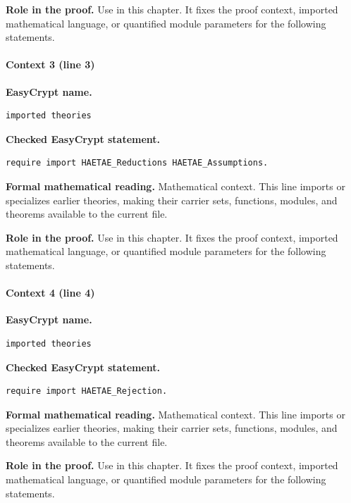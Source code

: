 \noindent\textbf{Role in the proof.}
Use in this chapter. It fixes the proof context, imported mathematical language, or quantified module parameters for the following statements.

\paragraph{Context 3 (line 3)}
\noindent\textbf{EasyCrypt name.}
\begin{lstlisting}[language=EasyCrypt,basicstyle=\ttfamily\scriptsize]
imported theories
\end{lstlisting}
\noindent\textbf{Checked EasyCrypt statement.}
\begin{lstlisting}[language=EasyCrypt,basicstyle=\ttfamily\scriptsize]
require import HAETAE_Reductions HAETAE_Assumptions.
\end{lstlisting}
\noindent\textbf{Formal mathematical reading.}
Mathematical context. This line imports or specializes earlier theories, making their carrier sets, functions, modules, and theorems available to the current file.

\noindent\textbf{Role in the proof.}
Use in this chapter. It fixes the proof context, imported mathematical language, or quantified module parameters for the following statements.

\paragraph{Context 4 (line 4)}
\noindent\textbf{EasyCrypt name.}
\begin{lstlisting}[language=EasyCrypt,basicstyle=\ttfamily\scriptsize]
imported theories
\end{lstlisting}
\noindent\textbf{Checked EasyCrypt statement.}
\begin{lstlisting}[language=EasyCrypt,basicstyle=\ttfamily\scriptsize]
require import HAETAE_Rejection.
\end{lstlisting}
\noindent\textbf{Formal mathematical reading.}
Mathematical context. This line imports or specializes earlier theories, making their carrier sets, functions, modules, and theorems available to the current file.

\noindent\textbf{Role in the proof.}
Use in this chapter. It fixes the proof context, imported mathematical language, or quantified module parameters for the following statements.

